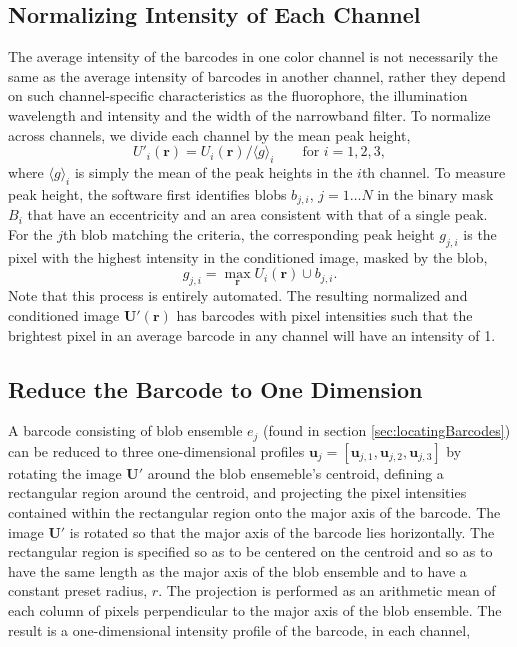 \subsection{Normalizing Intensity of Each Channel}
The average intensity of the barcodes in one color channel is not necessarily the same as the average intensity of barcodes in another channel, rather they depend on such channel-specific characteristics as the fluorophore, the illumination wavelength and intensity  and the width of  the narrowband filter. To normalize across channels, we divide each channel by the mean peak height, 
\begin{equation}
	U'_i(\mathbf{r})= U_i(\mathbf{r})/  \langle g \rangle_i   \qquad\text{for } i=1,2,3,
\end{equation}
where $\langle g \rangle_i$ is simply the mean of the peak heights in the $i$th channel. To measure peak height, the software first identifies blobs $b_{j,i}$, $j=1\ldots N$ in the binary mask $B_i$ that have an eccentricity and an area consistent with that of a single peak. For the $j$th  blob matching the criteria, the corresponding peak height $g_{j,i}$ is the pixel with the highest intensity in the conditioned image, masked by the blob,
\begin{equation}
	   g_{j,i}= \max_{\mathbf{r}}  U_i(\mathbf{r})\cup b_{j,i} .
\end{equation}
Note that this process is entirely automated. The resulting normalized and conditioned image $\mathbf{U}'(\mathbf{r})$ has barcodes with pixel intensities such that the brightest pixel in an average barcode in any channel will have an intensity of 1. 

  
\subsection{Reduce the Barcode to One Dimension}
A barcode consisting of blob ensemble $e_j$  (found in section \ref{sec:locatingBarcodes}) can be reduced to three one-dimensional profiles $\mathbf{u}_j=[\mathbf{u}_{j,1}, \mathbf{u}_{j,2}, \mathbf{u}_{j,3}]$ by rotating the image $\mathbf{U}'$ around the blob ensemeble's centroid, defining a rectangular region around the centroid, and projecting the pixel intensities contained within the rectangular region onto the major axis of the barcode.  The image $\mathbf{U}'$ is rotated so that the major axis of the barcode lies horizontally. The rectangular region is specified so as to be centered on the centroid and so as to have the same length as the major axis of the blob ensemble and to have a constant preset radius, $r$. The projection is performed as an arithmetic mean of each column of pixels perpendicular to the major axis of the blob ensemble. The result is a one-dimensional intensity profile of the barcode, in each channel, 

